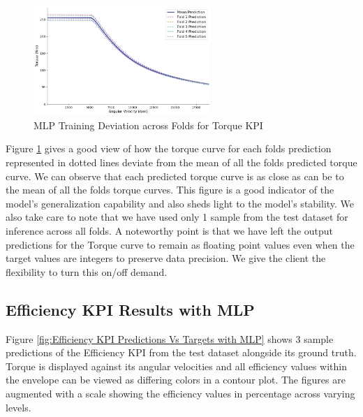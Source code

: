 \documentclass{report} %
\begin{document}
\begin{figure}[H]
    \centering
    \includegraphics[width=0.6\textwidth]{./ReportImages/folds_dev_y1.png} 
    \caption{MLP Training Deviation across Folds for Torque \ac{KPI}} 
    \label{fig:MLP Training Deviation across Folds for Torque KPI}
\end{figure}

Figure \ref{fig:MLP Training Deviation across Folds for Torque KPI} gives a good view of how the torque curve for each folds prediction represented in dotted lines deviate 
from the mean of all the folds predicted torque curve. We can observe that each predicted torque curve is as close as can be to the mean of all the folds torque curves.
This figure is a good indicator of the model's generalization capability and also sheds light to the model's stability.
We also take care to note that we have used only 1 sample from the test dataset for inference across all folds.
A noteworthy point is that we have left the output predictions for the Torque curve to remain as floating point values even when the target values are integers 
to preserve data precision. We give the client the flexibility to turn this on/off demand.

\subsection{Efficiency \ac{KPI} Results with \ac{MLP}}\label{sec:3D Efficiency Grid Results with MLP}
Figure \ref{fig:Efficiency KPI Predictions Vs Targets with MLP} shows 3 sample predictions of the Efficiency \ac{KPI} from the test dataset alongside its ground truth.
Torque is displayed against its angular velocities and all efficiency values within the envelope can be viewed as differing colors in a contour plot. 
The figures are augmented with a scale showing the efficiency values in percentage across varying levels.
\end{document}
